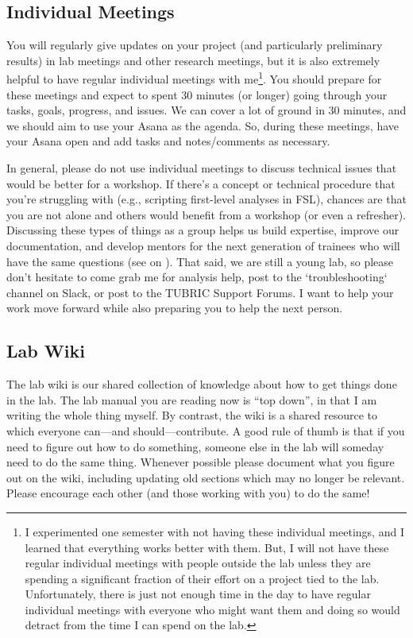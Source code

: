\documentclass[letterpaper,11pt,oneside]{memoir}
\begin{document}
\subsection{Individual Meetings}
You will regularly give updates on your project (and particularly preliminary results) in lab meetings and other research meetings, but it is also extremely helpful to have regular individual meetings with me\footnote{I experimented one semester with not having these individual meetings, and I learned that everything works better with them. But, I will not have these regular individual meetings with people outside the lab unless they are spending a significant fraction of their effort on a project tied to the lab. Unfortunately, there is just not enough time in the day to have regular individual meetings with everyone who might want them and doing so would detract from the time I can spend on the lab.}. You should prepare for these meetings and expect to spent 30 minutes (or longer) going through your tasks, goals, progress, and issues. We can cover a lot of ground in 30 minutes, and we should aim to use your Asana as the agenda. So, during these meetings, have your Asana open and add tasks and notes/comments as necessary. 

In general, please do not use individual meetings to discuss technical issues that would be better for a workshop. If there's a concept or technical procedure that you're struggling with (e.g., scripting first-level analyses in FSL), chances are that you are not alone and others would benefit from a workshop (or even a refresher). Discussing these types of things as a group helps us build expertise, improve our documentation, and develop mentors for the next generation of trainees who will have the same questions (see  on ). That said, we are still a young lab, so please don't hesitate to come grab me for analysis help, post to the `troubleshooting` channel on Slack, or post to the TUBRIC Support Forums. I want to help your work move forward while also preparing you to help the next person.

\subsection{Lab Wiki}
\label{sec:wiki}

The lab wiki is our shared collection of knowledge about how to get things done in the lab. The lab manual you are reading now is ``top down'', in that I am writing the whole thing myself. By contrast, the wiki is a shared resource to which everyone can---and should---contribute. A good rule of thumb is that if you need to figure out how to do something, someone else in the lab will someday need to do the same thing. Whenever possible please document what you figure out on the wiki, including updating old sections which may no longer be relevant. Please encourage each other (and those working with you) to do the same!
\end{document}
